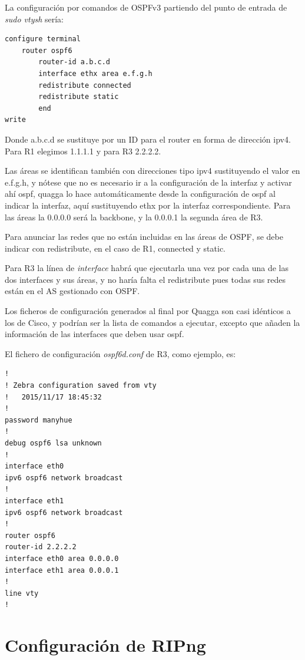 \documentclass{article}
\begin{document}
La configuración por comandos de OSPFv3 partiendo del punto de entrada de \textit{sudo vtysh} sería:

\hfil

\begin{BVerbatim}
configure terminal
	router ospf6
		router-id a.b.c.d
		interface ethx area e.f.g.h
		redistribute connected
		redistribute static
		end
write
\end{BVerbatim}

Donde a.b.c.d se sustituye por un ID para el router en forma de dirección ipv4. Para R1 elegimos 1.1.1.1 y para R3 2.2.2.2.

Las áreas se identifican también con direcciones tipo ipv4 sustituyendo el valor en e.f.g.h, y nótese que no es necesario ir a la configuración de la interfaz y activar ahí ospf, quagga lo hace automáticamente desde la configuración de ospf al indicar la interfaz, aquí sustituyendo ethx por la interfaz correspondiente. Para las áreas la 0.0.0.0 será la backbone, y la 0.0.0.1 la segunda área de R3.

Para anunciar las redes que no están incluidas en las áreas de OSPF, se debe indicar con redistribute, en el caso de R1, connected y static.

Para R3 la línea de \textit{interface} habrá que ejecutarla una vez por cada una de las dos interfaces y sus áreas, y no haría falta el redistribute pues todas sus redes están en el AS gestionado con OSPF.

\hfill

Los ficheros de configuración generados al final por Quagga son casi idénticos a los de Cisco, y podrían ser la lista de comandos a ejecutar, excepto que añaden la información de las interfaces que deben usar ospf.

\hfil

El fichero de configuración \textit{ospf6d.conf} de R3, como ejemplo, es:

\begin{lstlisting}
!
! Zebra configuration saved from vty
!   2015/11/17 18:45:32
!
password manyhue
!
debug ospf6 lsa unknown
!
interface eth0
ipv6 ospf6 network broadcast
!
interface eth1
ipv6 ospf6 network broadcast
!
router ospf6
router-id 2.2.2.2
interface eth0 area 0.0.0.0
interface eth1 area 0.0.0.1
!
line vty
!
\end{lstlisting}


\section{Configuración de RIPng}
\end{document}
